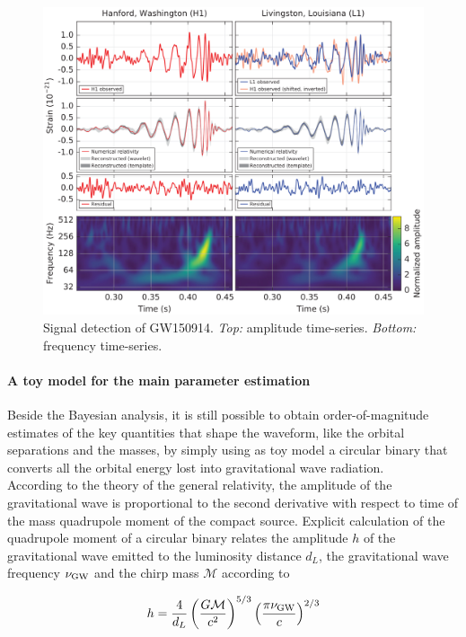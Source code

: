 \documentclass[a4paper,titlepage]{book}     	%
\begin{document}
\begin{figure}
	\includegraphics[width=\textwidth]{./images/GW150914.png}
	\caption{Signal detection of GW150914. \textit{Top:} amplitude time-series. \textit{Bottom:} frequency time-series. \cite{Abbott2016firstGW}}\label{fig:GW150914}
\end{figure}


\paragraph{A toy model for the main parameter estimation} Beside the Bayesian analysis, it is still possible to obtain order-of-magnitude estimates of the key quantities that shape the waveform, like the orbital separations and the masses, by simply using as toy model a circular binary that converts all the orbital energy lost into gravitational wave radiation. \\

According to the theory of the general relativity, the amplitude of the gravitational wave is proportional to the second derivative with respect to time of the mass quadrupole moment of the compact source.  Explicit calculation of the quadrupole moment of a circular binary relates the amplitude $h$  of the gravitational wave emitted to the luminosity distance $d_L$, the gravitational wave frequency $\nu_{\rm GW}$ and the chirp mass $\mathcal{M}$ according to

\begin{equation}\label{eq:h}
h = \frac{4}{d_L} \left(\frac{G \mathcal{M}}{c^2}\right)^{5/3} \left(\frac{\pi \nu_{\rm GW}}{c}\right)^{2/3} 
\end{equation}
\end{document}
